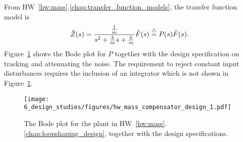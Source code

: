 From HW~\ref{hw:mass}.\ref{chap:transfer_function_models}, the transfer function model is
\[
\tilde{Z}(s) = \frac{\frac{1}{m}}{s^2+\frac{b}{m}s+\frac{k}{m}}\tilde{F}(s) \stackrel{\triangle}{=} P(s)\tilde{F}(s).
\]
Figure~\ref{fig:hw_mass_compensator_design_1} shows the Bode plot for $P$ together with the design specification on tracking and attenuating the noise.  The requirement to reject constant input disturbances requires the inclusion of an integrator which is not shown in Figure~\ref{fig:hw_mass_compensator_design_1}.
%
\begin{figure}[H]
   \centering
   \texttt{[image: 6\_design\_studies/figures/hw\_mass\_compensator\_design\_1.pdf]}
   \caption{The Bode plot for the plant in HW~\ref{hw:mass}.\ref{chap:loopshaping_design}, together with the design specifications.}
   \label{fig:hw_mass_compensator_design_1}
\end{figure}

